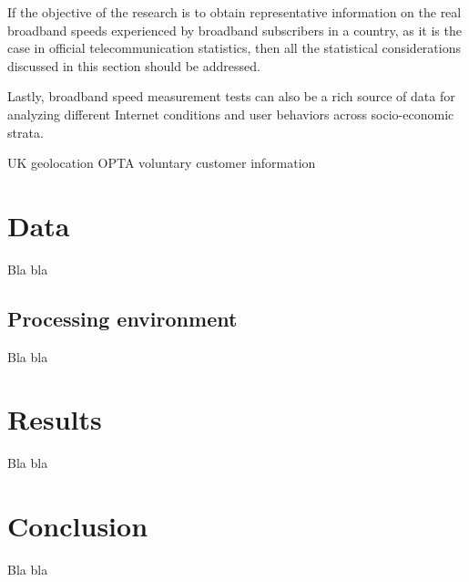 \documentclass[12pt]{article}
\begin{document}
If the objective of the research is to obtain representative information on the real broadband speeds experienced by broadband subscribers in a country, as it is the case in official telecommunication statistics, then all the statistical considerations discussed in this section should be addressed.

Lastly, broadband speed measurement tests can also be a rich source of data for analyzing different Internet conditions and user behaviors across socio-economic strata. 

UK geolocation               
OPTA voluntary customer information  

\section{Data}
Bla bla
\subsection{Processing environment}
Bla bla
\section{Results}
Bla bla
\section{Conclusion}
Bla bla




\end{document}
